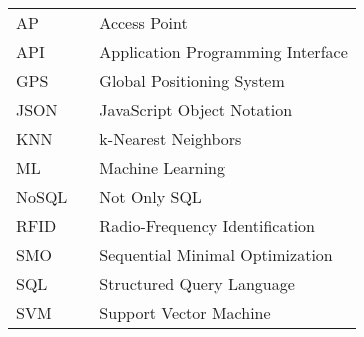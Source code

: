 \begin{table}[H]
\centering
\label{my-label}
\begin{tabular}{lll}
AP    &  & Access Point                                                          \\
API   &  & Application Programming Interface                                     \\
GPS   &  & Global Positioning System                                             \\
JSON  &  & JavaScript Object Notation                                            \\
KNN   &  & k-Nearest Neighbors                                                   \\
ML    &  & Machine Learning                                                      \\
NoSQL &  & Not Only SQL                                                          \\
RFID  &  & Radio-Frequency Identification                                        \\
SMO   &  & Sequential Minimal Optimization                                       \\
SQL   &  & Structured Query Language                                              \\
SVM   &  & Support Vector Machine                                               
\end{tabular}
\end{table}